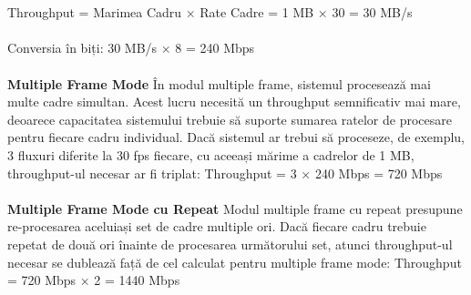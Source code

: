 \documentclass[12pt]{article}
\begin{document}
\\\\Throughput = Marimea Cadru × Rate Cadre = 1 MB × 30 = 30 MB/s\\\\
Conversia în biți: 30 MB/s × 8 = 240 Mbps\\\\
\hspace*{1cm}\textbf{Multiple Frame Mode}
În modul multiple frame, sistemul procesează mai multe cadre simultan. Acest lucru necesită un throughput semnificativ mai mare, deoarece capacitatea sistemului trebuie să suporte sumarea ratelor de procesare pentru fiecare cadru individual. Dacă sistemul ar trebui să proceseze, de exemplu, 3 fluxuri diferite la 30 fps fiecare, cu aceeași mărime a cadrelor de 1 MB, throughput-ul necesar ar fi triplat:
Throughput = 3 × 240 Mbps = 720 Mbps\\\\
\hspace*{1cm}\textbf{Multiple Frame Mode cu Repeat}
Modul multiple frame cu repeat presupune re-procesarea aceluiași set de cadre multiple ori. Dacă fiecare cadru trebuie repetat de două ori înainte de procesarea următorului set, atunci throughput-ul necesar se dublează față de cel calculat pentru multiple frame mode:
Throughput = 720 Mbps × 2 = 1440 Mbps
\end{document}
